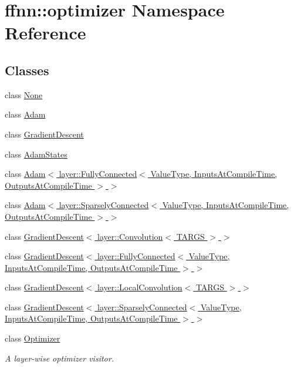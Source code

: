 \hypertarget{namespaceffnn_1_1optimizer}{\section{ffnn\-:\-:optimizer Namespace Reference}
\label{namespaceffnn_1_1optimizer}
}
\subsection*{Classes}
\begin{DoxyCompactItemize}
\item 
class \hyperlink{classffnn_1_1optimizer_1_1_none}{None}
\item 
class \hyperlink{classffnn_1_1optimizer_1_1_adam}{Adam}
\item 
class \hyperlink{classffnn_1_1optimizer_1_1_gradient_descent}{Gradient\-Descent}
\item 
class \hyperlink{classffnn_1_1optimizer_1_1_adam_states}{Adam\-States}
\item 
class \hyperlink{classffnn_1_1optimizer_1_1_adam_3_01layer_1_1_fully_connected_3_01_value_type_00_01_inputs_at_co08ce471fd3ee7441a350cc42cfd35bcd}{Adam$<$ layer\-::\-Fully\-Connected$<$ Value\-Type, Inputs\-At\-Compile\-Time, Outputs\-At\-Compile\-Time $>$ $>$}
\item 
class \hyperlink{classffnn_1_1optimizer_1_1_adam_3_01layer_1_1_sparsely_connected_3_01_value_type_00_01_inputs_at5101e46d32858ec2169acdeede08d723}{Adam$<$ layer\-::\-Sparsely\-Connected$<$ Value\-Type, Inputs\-At\-Compile\-Time, Outputs\-At\-Compile\-Time $>$ $>$}
\item 
class \hyperlink{classffnn_1_1optimizer_1_1_gradient_descent_3_01layer_1_1_convolution_3_01_t_a_r_g_s_01_4_01_4}{Gradient\-Descent$<$ layer\-::\-Convolution$<$ T\-A\-R\-G\-S $>$ $>$}
\item 
class \hyperlink{classffnn_1_1optimizer_1_1_gradient_descent_3_01layer_1_1_fully_connected_3_01_value_type_00_01_5f7b01db2ae4d39760d70ee323649a60}{Gradient\-Descent$<$ layer\-::\-Fully\-Connected$<$ Value\-Type, Inputs\-At\-Compile\-Time, Outputs\-At\-Compile\-Time $>$ $>$}
\item 
class \hyperlink{classffnn_1_1optimizer_1_1_gradient_descent_3_01layer_1_1_local_convolution_3_01_t_a_r_g_s_01_4_01_4}{Gradient\-Descent$<$ layer\-::\-Local\-Convolution$<$ T\-A\-R\-G\-S $>$ $>$}
\item 
class \hyperlink{classffnn_1_1optimizer_1_1_gradient_descent_3_01layer_1_1_sparsely_connected_3_01_value_type_00_e6c27913ab0d90f52f73031aa88c19bf}{Gradient\-Descent$<$ layer\-::\-Sparsely\-Connected$<$ Value\-Type, Inputs\-At\-Compile\-Time, Outputs\-At\-Compile\-Time $>$ $>$}
\item 
class \hyperlink{classffnn_1_1optimizer_1_1_optimizer}{Optimizer}
\begin{DoxyCompactList}\small\item\em A layer-\/wise optimizer visitor. \end{DoxyCompactList}\end{DoxyCompactItemize}
